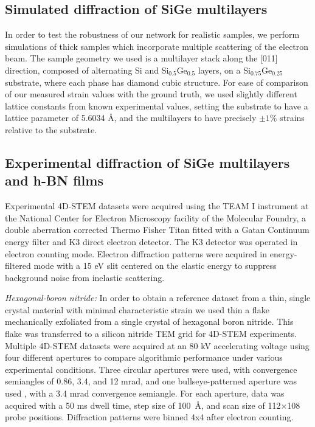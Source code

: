 \documentclass[%
 reprint,
superscriptaddress,
 amsmath,
 amssymb,
 prl,
]{revtex4-2}
\begin{document}
\subsection*{Simulated diffraction of SiGe multilayers}

In order to test the robustness of our network for realistic samples, we perform simulations of thick samples which incorporate multiple scattering of the electron beam. The sample geometry we used is a multilayer stack along the [011] direction, composed of alternating Si and Si$_{0.5}$Ge$_{0.5}$ layers, on a Si$_{0.75}$Ge$_{0.25}$ substrate, where each phase has diamond cubic structure.
For ease of comparison of our measured strain values with the ground truth, we used slightly different lattice constants from known experimental values, setting the substrate to have a lattice parameter of 5.6034 \AA{}, and the multilayers to have precisely $\pm 1\%$ strains relative to the substrate.

\subsection*{Experimental diffraction of SiGe multilayers and h-BN films}

Experimental 4D-STEM datasets were acquired using the TEAM I instrument at the National Center for Electron Microscopy facility of the Molecular Foundry, a double aberration corrected Thermo Fisher Titan fitted with a Gatan Continuum energy filter and K3 direct electron detector. The K3 detector was operated in electron counting mode. Electron diffraction patterns were acquired in energy-filtered mode with a 15 eV slit centered on the elastic energy to suppress background noise from inelastic scattering.


\textit{Hexagonal-boron nitride:} In order to obtain a reference dataset from a thin, single crystal material with minimal characteristic strain we used thin a flake mechanically exfoliated from a single crystal of hexagonal boron nitride.  This flake was transferred to a silicon nitride TEM grid for 4D-STEM experiments. Multiple 4D-STEM datasets were acquired at an 80 kV accelerating voltage using four different apertures to compare algorithmic performance under various experimental conditions.  Three circular apertures were used, with convergence semiangles of 0.86, 3.4, and 12 mrad, and one bullseye-patterned aperture was used \citep{zeltmann2020patterned}, with a 3.4 mrad convergence semiangle.  For each aperture, data was acquired with a 50 ms dwell time, step size of 100~\AA{}, and scan size of 112$\times$108 probe positions. Diffraction patterns were binned 4x4 after electron counting. 
\end{document}
